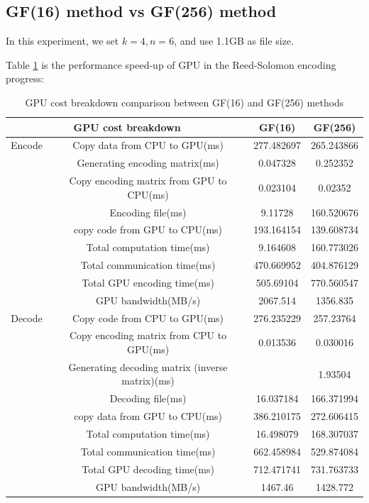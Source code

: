 \documentclass[a4paper]{article}
\begin{document}
\subsection{GF(16) method vs GF(256) method}
In this experiment, we set $k=4, n=6$, and use 1.1GB as file size.

Table \ref{GF16vsGF256} is the performance speed-up of GPU in the Reed-Solomon encoding progress:
\begin{table}
\caption{
GPU cost breakdown comparison between GF(16) and GF(256) methods
}
\begin{center}
\begin{tabular}{|c|c|c|c|}
\hline
\multicolumn{2}{|c|}{GPU cost breakdown}  & GF(16) & GF(256) \\
\hline
Encode & Copy data from CPU to GPU(ms)	& 277.482697	& 265.243866 \\
& Generating encoding matrix(ms)	& 0.047328	& 0.252352 \\
& Copy encoding matrix from GPU to CPU(ms)	& 0.023104	& 0.02352 \\
& Encoding file(ms)	& 9.11728	& 160.520676 \\
& copy code from GPU to CPU(ms)	& 193.164154	& 139.608734 \\
& Total computation time(ms)	& 9.164608	& 160.773026 \\
& Total communication time(ms)	& 470.669952	& 404.876129 \\
& Total GPU encoding time(ms)	& 505.69104	& 770.560547 \\
& GPU bandwidth(MB/s)	& 2067.514	& 1356.835 \\
\hline
Decode & Copy code from CPU to GPU(ms)	& 276.235229	& 257.23764 \\
& Copy encoding matrix from CPU to GPU(ms)	& 0.013536	& 0.030016 \\
& Generating decoding matrix (inverse matrix)(ms)		& & 1.93504 \\
& Decoding file(ms)	& 16.037184	& 166.371994 \\
& copy data from GPU to CPU(ms)	& 386.210175	& 272.606415 \\
& Total computation time(ms)	& 16.498079	& 168.307037 \\
& Total communication time(ms)	& 662.458984	& 529.874084 \\
& Total GPU decoding time(ms)	& 712.471741	& 731.763733 \\
& GPU bandwidth(MB/s)	& 1467.46	& 1428.772 \\
\hline
\end{tabular}
\label{GF16vsGF256}
\end{center}
\end{table}
\end{document}
